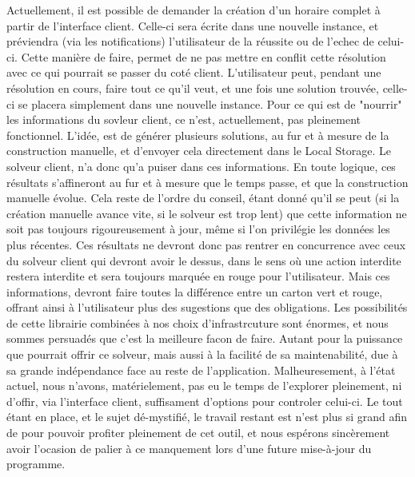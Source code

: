Actuellement, il est possible de demander la création d'un horaire complet à partir de l'interface client. Celle-ci sera écrite dans une nouvelle instance, et préviendra (via les notifications) l'utilisateur de la réussite ou de l'echec de celui-ci.  Cette manière de faire, permet de ne pas mettre en conflit cette résolution avec ce qui pourrait se passer du coté client. L'utilisateur peut, pendant une résolution en cours, faire tout ce qu'il veut, et une fois une solution trouvée, celle-ci se placera simplement dans une nouvelle instance.
Pour ce qui est de "nourrir" les informations du sovleur client, ce n'est, actuellement, pas pleinement fonctionnel. L'idée, est de générer plusieurs solutions, 
au fur et à mesure de la construction manuelle, et d'envoyer cela directement dans le Local Storage. Le solveur client, n'a donc qu'a puiser dans ces informations.
En toute logique, ces résultats s'affineront au fur et à mesure que le temps passe, et que la construction manuelle évolue. Cela reste de l'ordre du conseil, étant donné qu'il se peut (si la création manuelle avance vite, si le solveur est trop lent) que cette information ne soit pas toujours rigoureusement à jour, même si l'on privilégie les données les plus récentes.  Ces résultats ne devront donc pas rentrer en concurrence avec ceux du solveur client qui devront avoir le dessus, dans le sens où une action interdite restera interdite et sera toujours marquée en rouge pour l'utilisateur. 
Mais ces informations, devront faire toutes la différence entre un carton vert et rouge, offrant ainsi à l'utilisateur plus des sugestions que des obligations. 
\newline
\indent
Les possibilités de cette librairie combinées à nos choix d'infrastrcuture sont énormes, et nous sommes persuadés que c'est la meilleure facon de faire. Autant pour la puissance que pourrait offrir ce solveur, mais aussi à la facilité de sa maintenabilité, due à sa grande indépendance face au reste de l'application.
Malheuresement, à l'état actuel, nous n'avons, matérielement, pas eu le temps de l'explorer pleinement, ni d'offir, via l'interface client, suffisament d'options pour controler celui-ci.
Le tout étant en place, et le sujet dé-mystifié, le travail restant est n'est plus si grand afin de pour pouvoir profiter pleinement de cet outil, et nous espérons sincèrement avoir l'ocasion de palier à ce manquement lors d'une future mise-à-jour du programme.
